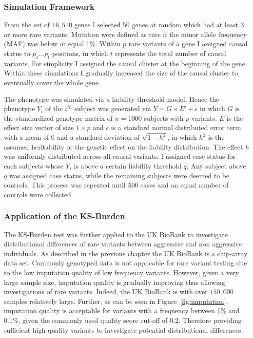 \subsubsection{Simulation Framework}
\label{ssub:Simulation_Framework}

From the set of $16,510$ genes I selected 50 genes at random which had at least 3 or more rare variants. 
Mutation were defined as rare if the minor allele frequency (MAF) was below or equal 1\%. 
Within $p$ rare variants of a gene I assigned causal status to $p_1 \ldots p_t$ positions, in which $t$ represents the total number of causal variants.
For simplicity I assigned the causal cluster at the beginning of the gene.
Within these simulations I gradually increased the size of the causal cluster to eventually cover the whole gene. 

The phenotype was simulated via a liability threshold model.
Hence the phenotype $Y_i$ of the $i^{th}$ subject was generated via
$Y = G\times E' + \epsilon$
in which $G$ is the standardized genotype matrix of $n=1000$ subjects with $p$ variants.
$E$ is the effect size vector of size $1\times p$ and $\epsilon$ is a standard normal distributed error term with a mean of $0$ and a standard deviation of $\sqrt{1-h^2}$, in which $h^2$ is the assumed heritability or the genetic effect on the liability distribution.
The effect $h$ was uniformly distributed across all causal variants.
I assigned case status for each subjects whose $Y_i$ is above a certain liability threshold $q$.
Any subject above $q$ was assigned case status, while the remaining subjects were deemed to be controls.
This process was repeated until $500$ cases and an equal number of controls were collected.

\subsubsection{Application of the KS-Burden}
\label{ssub:Application_of_the_KS-Burden}

The KS-Burden test was further applied to the UK BioBank to investigate distributional differences of rare variants between aggressive and non aggressive individuals.
As described in the previous chapter the UK BioBank is a chip-array data set.
Commonly genotyped data is not applicable for rare variant testing due to the low imputation quality of low frequency variants.
However, given a very large sample size, imputation quality is gradually improving thus allowing investigations of rare variants.
Indeed, the UK BioBank is with over $150,000$ samples relatively large.
Further, as can be seen in Figure~\ref{fig:imputation}, imputation quality is acceptable for variants with a frequency between 1\% and 0.1\%, given the commonly used quality score cut-off of $0.2$.
Therefore providing sufficient high quality variants to investigate potential distributional differences.

